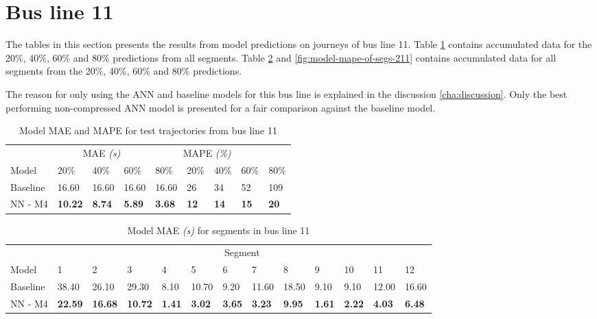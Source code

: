 \section{Bus line 11}
The tables in this section presents the results from model predictions on journeys of bus line 11. Table \ref{tbl:models-mae-and-mape-211} contains accumulated data for the 20\%, 40\%, 60\% and 80\% predictions from all segments. Table \ref{tbl:model-mae-of-segs-211} and \ref{fig:model-mape-of-segs-211} contains accumulated data for all segments from the 20\%, 40\%, 60\% and 80\% predictions.

The reason for only using the ANN and baseline models for this bus line is explained in the discussion \ref{cha:discussion}. Only the best performing non-compressed ANN model is presented for a fair comparison against the baseline model.
\begin{table}[H]
	\centering
	\caption{Model MAE and MAPE for test trajectories from bus line 11}
	\label{tbl:models-mae-and-mape-211}
	\begin{tabular}{l | l | l | l | l || l | l | l | l }
		& \multicolumn{3}{c}{MAE \textit{(s)}} & \multicolumn{4}{c}{MAPE \textit{(\%)}} \\
		Model      & 20\% & 40\% & 60\% & 80\% & 20\% & 40\% & 60\% & 80\% \\
		\hline
		Baseline & 16.60 & 16.60 & 16.60 & 16.60  & 26 & 34 & 52 & 109 \\
		NN - M4        & \textbf{10.22}& \textbf{8.74}& \textbf{5.89}& \textbf{3.68}& \textbf{12}& \textbf{14}& \textbf{15}& \textbf{20} \\
	\end{tabular}
\end{table}

\begin{table}[H]
	\centering
	\caption{Model MAE \textit{(s)} for segments in bus line 11}
	\label{tbl:model-mae-of-segs-211}
	\begin{adjustbox}{center}
	\begin{tabular}{ l | l | l | l | l | l | l | l | l | l | l | l | l}
		& \multicolumn{12}{c}{Segment} \\
		Model       & 1 & 2 & 3 & 4 & 5 & 6 & 7 & 8 & 9 & 10 & 11 & 12 \\
		\hline
		Baseline  & 38.40 & 26.10 & 29.30 & 8.10 & 10.70 & 9.20 & 11.60 & 18.50 & 9.10 & 9.10  & 12.00 & 16.60 \\
		NN - M4         & \textbf{22.59}& \textbf{16.68}& \textbf{10.72}& \textbf{1.41}& \textbf{3.02}& \textbf{3.65}& \textbf{3.23}& \textbf{9.95}& \textbf{1.61}& \textbf{2.22}& \textbf{4.03}& \textbf{6.48}\\
	\end{tabular}
	\end{adjustbox}
\end{table}

